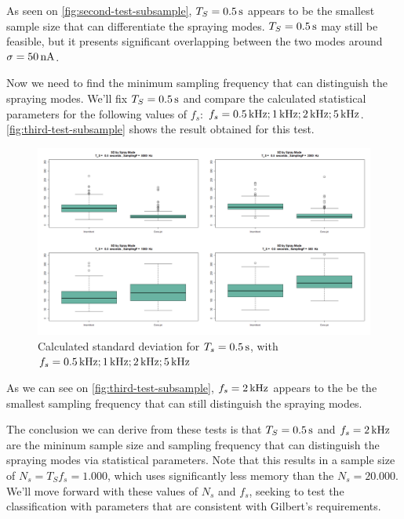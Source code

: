 \documentclass[oneside,12pt]{article}
\begin{document}
As seen on \autoref{fig:second-test-subsample}, $T_S = 0.5 \,\mathrm{s}$ appears to be the smallest sample size that can differentiate the spraying modes.
$T_S = 0.5 \,\mathrm{s}$ may still be feasible, but it presents significant overlapping between the two modes around $\sigma = 50 \,\mathrm{nA}$.

Now we need to find the minimum sampling frequency that can distinguish the spraying modes. We'll fix $T_S = 0.5 \,\mathrm{s}$ and compare the calculated 
statistical parameters for the following values of $f_s$: $f_s = 0.5 \,\mathrm{kHz}; 1 \,\mathrm{kHz}; 2 \,\mathrm{kHz}; 5 \,\mathrm{kHz}$. \autoref{fig:third-test-subsample}
shows the result obtained for this test.

\begin{figure}[h!]
    \centering
    \includegraphics[width=1\textwidth,trim=1 1 1 1,clip]{figures/third-test-subsample.png}
    \caption{Calculated standard deviation for $T_s = 0.5 \,\mathrm{s}$, with $f_s = 0.5 \,\mathrm{kHz}; 1 \,\mathrm{kHz}; 2 \,\mathrm{kHz}; 5 \,\mathrm{kHz}$}
    \label{fig:third-test-subsample}
\end{figure}

As we can see on \autoref{fig:third-test-subsample}, $f_s = 2 \,\mathrm{kHz}$ appears to the be the smallest sampling frequency that can still distinguish the spraying  
modes. 

The conclusion we can derive from these tests is that $T_S = 0.5 \,\mathrm{s}$ and $f_s = 2 \,\mathrm{kHz}$ are the mininum sample size and sampling frequency that
can distinguish the spraying modes via statistical parameters. Note that this results in a sample size of $N_s = T_S f_s = 1.000$, which uses 
significantly less memory than the $N_s = 20.000$. We'll move forward with these values of $N_s$ and $f_s$, seeking to test the classification
with parameters that are consistent with Gilbert's requirements.
\end{document}
